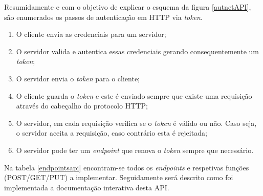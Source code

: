 Resumidamente e com o objetivo de explicar o esquema da figura \ref{autnetAPI}, são enumerados os passos de autenticação em \ac{HTTP} via \textit{token}. 

\begin{enumerate}
	\item O cliente envia as credenciais para um servidor;
	\item O servidor valida e autentica essas credenciais gerando consequentemente um \textit{token};
	\item O servidor envia o \textit{token} para o cliente;
	\item O cliente guarda o \textit{token} e este é enviado sempre que existe uma requisição através do cabeçalho do protocolo HTTP; 
	\item O servidor, em cada requisição verifica se o \textit{token} é válido ou não. Caso seja, o servidor aceita a requisição, caso contrário esta é rejeitada;
	\item O servidor pode ter um \textit{endpoint} que renova o \textit{token} sempre que necessário. 
\end{enumerate}

Na tabela \ref{endpointsapi} encontram-se todos os \textit{endpoints} e respetivas funções (POST/GET/PUT) a implementar. Seguidamente será descrito como foi implementada a documentação interativa desta \ac{API}.  

